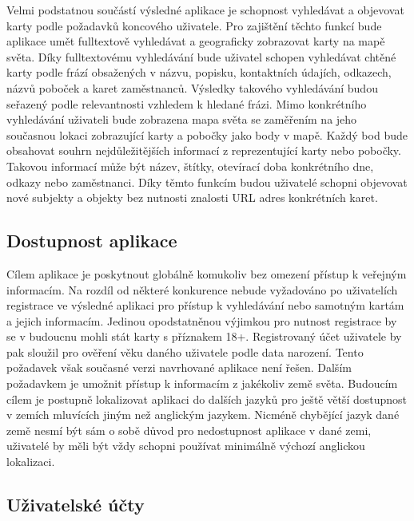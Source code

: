 \begin{itemize}
\begin{itemize}
	Velmi podstatnou součástí výsledné aplikace je schopnost vyhledávat a objevovat karty podle požadavků koncového uživatele.
	Pro zajištění těchto funkcí bude aplikace umět fulltextově vyhledávat a geograficky zobrazovat karty na mapě světa.
	Díky fulltextovému vyhledávání bude uživatel schopen vyhledávat chtěné karty podle frází obsažených v názvu,
	popisku, kontaktních údajích, odkazech, názvů poboček a karet zaměstnanců.
	Výsledky takového vyhledávání budou seřazený podle relevantnosti vzhledem k hledané frázi.
	Mimo konkrétního vyhledávání uživateli bude zobrazena mapa světa se zaměřením na jeho současnou lokaci zobrazující
	karty a pobočky jako body v mapě.
	Každý bod bude obsahovat souhrn nejdůležitějších informací z reprezentující karty nebo pobočky.
	Takovou informací může být název, štítky, otevírací doba konkrétního dne, odkazy nebo zaměstnanci.
	Díky těmto funkcím budou uživatelé schopni objevovat nové subjekty a objekty bez nutnosti znalosti URL adres
	konkrétních karet.

	\subsection{Dostupnost aplikace}

	Cílem aplikace je poskytnout globálně komukoliv bez omezení přístup k veřejným informacím.
	Na rozdíl od některé konkurence nebude vyžadováno po uživatelích registrace ve výsledné aplikaci pro přístup k vyhledávání
	nebo samotným kartám a jejich informacím.
	Jedinou opodstatněnou výjimkou pro nutnost registrace by se v budoucnu mohli stát karty s příznakem 18+.
	Registrovaný účet uživatele by pak sloužil pro ověření věku daného uživatele podle data narození.
	Tento požadavek však současné verzi navrhované aplikace není řešen.
	Dalším požadavkem je umožnit přístup k informacím z jakékoliv země světa.
	Budoucím cílem je postupně lokalizovat aplikaci do dalších jazyků pro ještě větší dostupnost v zemích mluvících
	jiným než anglickým jazykem.
	Nicméně chybějící jazyk dané země nesmí být sám o sobě důvod pro nedostupnost aplikace v dané zemi, uživatelé by
	měli být vždy schopni používat minimálně výchozí anglickou lokalizaci.

	\subsection{Uživatelské účty}


\end{itemize}
\end{itemize}
